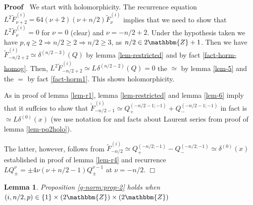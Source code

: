 \documentclass{article}
\newenvironment{proof}{\noindent\textbf{Proof\ }}{\hspace*{\fill}$\Box$\medskip}
\numberwithin{definition}{section}
\newtheorem{lemma}{Lemma}
\numberwithin{lemma}{section}
\numberwithin{proposition}{section}
{\theorembodyfont{\rmfamily}\newtheorem{remark}{Remark}
\numberwithin{remark}{section}
}
\begin{document}
\begin{proof}
  We start with holomorphicity. The recurrence equation $L^2 \tilde{F}^{(
  i)}_{\nu + 2} = 64 ( \nu + 2) ( \nu + n / 2) \tilde{F}_{\nu}^{( i)}$ implies
  that we need to show that $L^2 \tilde{F}_{\nu}^{( i)} = 0$ for $\nu = 0$
  (clear) and $\nu = - n / 2 + 2$. Under the hypothesis taken we have $p, q
  \geqslant 2 \Rightarrow n / 2 \geqslant 2 \Rightarrow n / 2 \geqslant 3$, as
  $n / 2 \in 2\mathbbm{Z}+ 1$. Then we have $\tilde{F}_{- n / 2 + 2}^{( i)}
  \simeq \delta^{( n / 2 - 3)} ( Q)$ by lemma \ref{lem-restricted} and by fact
  \ref{fact-horm-homog}. Then, $L^2 \tilde{F}_{- n / 2 + 2}^{( i)} \simeq L^{}
  \delta^{( n / 2 - 2)} ( Q) = 0$ the $\simeq$ by lemma \ref{lem-5} and the
  $=$ by fact \ref{fact-horm1}. This shows holomorphicity.
  
  As in proof of lemma \ref{lem-r1}, lemma \ref{lem-restricted} and lemma
  \ref{lem-6} imply that it suffcies to show that $\tilde{F}_{- n / 2 - 1}^{(
  i)} \simeq Q_+^{( - n / 2 - 1 ; - 1)} + Q_-^{( - n / 2 - 1 ; - 1)}$ in fact
  is $\simeq L \delta^{( 0)} ( x)$ (we use notation for and facts about
  Laurent series from proof of lemma \ref{lem-pq2holo}).
  
  The latter, however, follows from $\tilde{F}_{- n / 2}^{( i)} \simeq Q_+^{(
  - n / 2 ; - 1)} - Q_-^{( - n / 2 ; - 1)} \simeq \delta^{( 0)} ( x)$
  established in proof of lemma \ref{lem-r4} and recurrence $L Q_{\pm}^{\nu} =
  \pm 4 \nu ( \nu + n / 2 - 1) Q_{\pm}^{\nu - 1}$ at $\nu = - n / 2$.
\end{proof}

\begin{lemma}
  \label{lem-r3}Proposition \ref{q-norm:prop-2} holds when $( i, n / 2, p) \in
  \{ 1 \} \times ( 2\mathbbm{Z}) \times ( 2\mathbbm{Z})$
\end{lemma}
\end{document}
